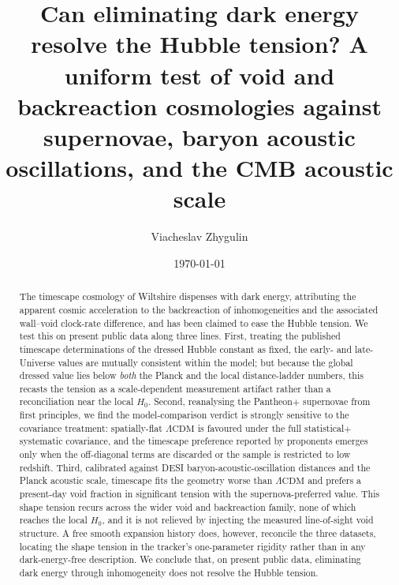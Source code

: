 \documentclass[aps,prd,twocolumn,nofootinbib,superscriptaddress,floatfix]{revtex4-2}
\newcommand{\Ho}{H_{0}}
\newcommand{\Lcdm}{\Lambda\mathrm{CDM}}
\begin{document}
\title{Can eliminating dark energy resolve the Hubble tension?
A uniform test of void and backreaction cosmologies against
supernovae, baryon acoustic oscillations, and the CMB acoustic scale}

\author{Viacheslav Zhygulin}
\date{\today}

\begin{abstract}
The timescape cosmology of Wiltshire dispenses with dark energy, attributing the
apparent cosmic acceleration to the backreaction of inhomogeneities and the
associated wall--void clock-rate difference, and has been claimed to ease the
Hubble tension. We test this on present public data along three lines. First,
treating the published timescape determinations of the dressed Hubble constant as
fixed, the early- and late-Universe values are mutually consistent within the
model; but because the global dressed value lies below \emph{both} the Planck and
the local distance-ladder numbers, this recasts the tension as a scale-dependent
measurement artifact rather than a reconciliation near the local $\Ho$. Second,
reanalysing the Pantheon$+$ supernovae from first principles, we find the
model-comparison verdict is strongly sensitive to the covariance treatment:
spatially-flat $\Lcdm$ is favoured under the full statistical$+$systematic
covariance, and the timescape preference reported by proponents emerges only when
the off-diagonal terms are discarded or the sample is restricted to low redshift.
Third, calibrated against DESI baryon-acoustic-oscillation distances and the
Planck acoustic scale, timescape fits the geometry worse than $\Lcdm$ and prefers
a present-day void fraction in significant tension with the supernova-preferred
value. This shape tension recurs across the wider void and backreaction family,
none of which reaches the local $\Ho$, and it is not relieved by injecting the
measured line-of-sight void structure. A free smooth expansion history does, however,
reconcile the three datasets, locating the shape tension in the tracker's
one-parameter rigidity rather than in any dark-energy-free description. We conclude
that, on present public data,
eliminating dark energy through inhomogeneity does not resolve the Hubble tension.
\end{abstract}

\maketitle
\end{document}
